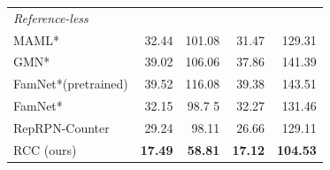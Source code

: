 \begin{tabular}{lrrrr}
\midrule
\textit{Reference-less} & & & & \\
MAML* 
\cite{finn2017model}
& 32.44 & 101.08 & 31.47 & 129.31 \\
GMN* 
\cite{Lu18}
& 39.02 & 106.06& 37.86& 141.39 \\
 FamNet*(pretrained) 
 \cite{ranjan2021Famnet}
 & 39.52 & 116.08 & 39.38 & 143.51 \\
FamNet*
\cite{ranjan2021Famnet}
& 32.15 & 98.7 5& 32.27 & 131.46 \\
 RepRPN-Counter 
 \cite{ranjan2022exemplar}
 & 29.24 & 98.11 & 26.66 & 129.11 \\
RCC (ours) & \textbf{17.49}  & \textbf{58.81} & \textbf{17.12}  & \textbf{104.53} \\
\bottomrule
\end{tabular}
